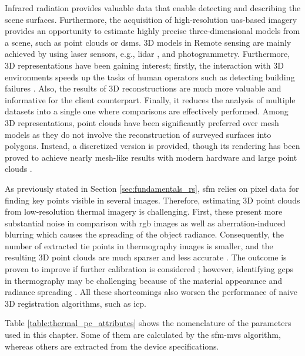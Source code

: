 Infrared radiation provides valuable data that enable detecting and describing the scene surfaces. Furthermore, the acquisition of high-resolution \acrshort{uas}-based imagery provides an opportunity to estimate highly precise three-dimensional models from a scene, such as point clouds or \acrshort{dsm}s. 3D models in Remote sensing are mainly achieved by using laser sensors, e.g., \acrshort{lidar} \cite{yandun_narvaez_survey_2017}, and photogrammetry. Furthermore, 3D representations have been gaining interest; firstly, the interaction with 3D environments speeds up the tasks of human operators such as detecting building failures \cite{lin_fusion_2019}. Also, the results of 3D reconstructions are much more valuable and informative for the client counterpart. Finally, it reduces the analysis of multiple datasets into a single one where comparisons are effectively performed. Among 3D representations, point clouds have been significantly preferred over mesh models as they do not involve the reconstruction of surveyed surfaces \cite{park_comparison_2019} into polygons. Instead, a discretized version is provided, though its rendering has been proved to achieve nearly mesh-like results with modern hardware and large point clouds \cite{schutz_rendering_2021}.   

As previously stated in Section \ref{sec:fundamentals_rs}, \acrshort{sfm} relies on pixel data for finding key points visible in several images. Therefore, estimating 3D point clouds from low-resolution thermal imagery is challenging. First, these present more substantial noise in comparison with \acrshort{rgb} images \cite{sledz_thermal_2018} as well as aberration-induced blurring which causes the spreading of the object radiance. Consequently, the number of extracted tie points in thermography images is smaller, and the resulting 3D point clouds are much sparser and less accurate \cite{jarzabek-rychard_supervised_2020}. The outcome is proven to improve if further calibration is considered \cite{ribeiro-gomes_uncooled_2017}; however, identifying \acrshort{gcp}s in thermography may be challenging because of the material appearance and radiance spreading \cite{javadnejad_photogrammetric_2020}. All these shortcomings also worsen the performance of naive 3D registration algorithms, such as \acrshort{icp}.

Table \ref{table:thermal_pc_attributes} shows the nomenclature of the parameters used in this chapter. Some of them are calculated by the \acrshort{sfm}-\acrshort{mvs} algorithm, whereas others are extracted from the device specifications.

